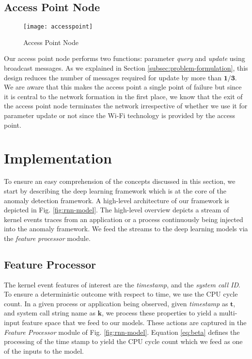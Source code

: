 \subsection{Access Point Node}
\begin{figure}[!t]
	\centering
	\texttt{[image: accesspoint]} 
	\caption{Access Point Node}
	\label{fig:access-point}
\end{figure}
Our access point node performs two functions: parameter 
\emph{query} and \emph{update} using broadcast messages. As 
we explained in Section \ref{subsec:problem-formulation}, 
this design reduces the number of messages required for 
update by more than $ \bm{1/3} $. We are aware that this 
makes the access point a single point of failure but since it 
is central to the network formation in the first place, we 
know that the exit of the access point node terminates the 
network irrespective of whether we use it for parameter 
update or not since the Wi-Fi technology is provided by the 
access point.
\section{Implementation}
\label{sec:implementation}
To ensure an easy comprehension of the concepts discussed in 
this section, we start by describing the deep learning 
framework which is at the core of the anomaly detection 
framework. A high-level architecture of our framework is 
depicted in Fig. 
\ref{fig:rnn-model}. The 
high-level 
overview depicts a stream of kernel events traces from an 
application or a process continuously being injected into the 
anomaly framework.
We feed the streams to the deep learning models via the 
\emph{feature 
	processor} module. 

\subsection{Feature Processor}
The kernel event features of interest are the 
\emph{timestamp}, and the \emph{system call ID}. To ensure a 
deterministic 
outcome with respect to time, we use the 
CPU cycle count. In a given process or application being 
observed, given \emph{timestamp} 
as $\mathbf{t} $, and system call string name as $ \mathbf{k} 
$, we process these properties to 
yield a multi-input feature space that we feed to our models. 
These actions are captured in the \emph{Feature Processor} 
module of Fig. \ref{fig:rnn-model}. Equation 
\eqref{eq:beta} defines the processing of the time stamp to 
yield the CPU cycle count which we feed as one of the inputs 
to the model.

